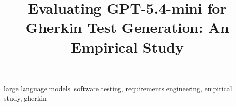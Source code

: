 \documentclass[conference]{IEEEtran}
\begin{document}
\title{Evaluating GPT-5.4-mini for Gherkin Test Generation: An Empirical Study}
\author{
}
\maketitle



\begin{IEEEkeywords}
large language models, software testing, requirements engineering, empirical study, gherkin
\end{IEEEkeywords}











\end{document}
